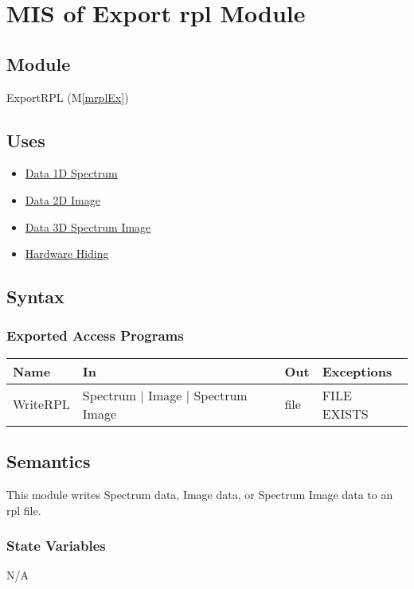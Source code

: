 \documentclass[12pt, titlepage]{article}
\newcommand{\mref}[1]{M\ref{#1}}
\begin{document}
\section{MIS of Export rpl Module} \label{Mod:ExportRPL}

\subsection{Module}

ExportRPL (\mref{mrplEx})

\subsection{Uses}
\begin{itemize}
    \item \hyperref[Mod:Spectrum]{Data 1D Spectrum}
    \item \hyperref[Mod:Image]{Data 2D Image}
    \item \hyperref[Mod:SI]{Data 3D Spectrum Image}
    \item \hyperref[Mod:HH]{Hardware Hiding}
\end{itemize}

\subsection{Syntax}

\subsubsection{Exported Access Programs}

\begin{center}
    \begin{tabular}{p{2cm} p{4cm} p{4cm} p{4cm}}
        \hline
        \textbf{Name} & \textbf{In} & \textbf{Out} & \textbf{Exceptions} \\
        \hline
        WriteRPL & Spectrum $|$ Image $|$ Spectrum Image & file & FILE EXISTS \\
        \hline
    \end{tabular}
\end{center}

\subsection{Semantics}
This module writes Spectrum data, Image data, or Spectrum Image data to an rpl
file.

\subsubsection{State Variables}
N/A
\end{document}
